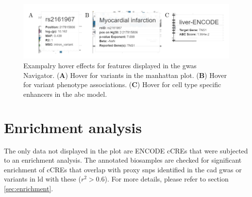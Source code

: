     \begin{figure}[h!]
    \capstart
        \centering
        \includegraphics{Abbildung/GWAS_navigator_hover.pdf}

        \begin{minipage}{\captionwidth}
            \caption[database]{\newline
            Exampalry hover effects for features displayed in the \ac{gwas} Navigator. (\textbf{A}) Hover for variants in the manhattan plot. (\textbf{B}) Hover for variant phenotype associations. (\textbf{C}) Hover for cell type specific enhancers in the \ac{abc} model.}
            \label{fig:GWAS_navigator_hover}
        \end{minipage}
    \end{figure}

\section{Enrichment analysis}
\label{sec:result_enrichment}
The only data not displayed in the plot are ENCODE \acp{cCRE} that were subjected to an enrichment analysis. The annotated biosamples are checked for significant enrichment of \acp{cCRE} that overlap with proxy \acp{snp} identified in the \ac{cad} \ac{gwas} or variants in \ac{ld} with these ($r^2 > 0.6$). For more details, please refer to section \ref{sec:enrichment}.

